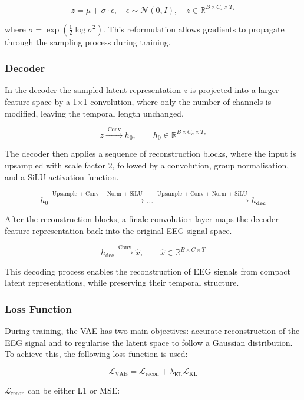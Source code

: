\[
z = \mu + \sigma \cdot \epsilon, \quad \epsilon \sim \mathcal{N}(0, I), \quad z \in \mathbb{R}^{B \times C_z \times T_z}
\]

where $\sigma = \exp\left(\frac{1}{2} \log \sigma^2 \right)$. This reformulation allows gradients to propagate through the sampling process during training.

\subsubsection{Decoder}

In the decoder the sampled latent representation $z$ is projected into a larger feature space by a 1$\times$1 convolution, where only the number of channels is modified, leaving the temporal length unchanged. 

\[
z  \xrightarrow{\;\text{Conv}\;} h_0, \qquad h_0 \in \mathbb{R}^{B \times C_d \times T_z}
\]

The decoder then applies a sequence of reconstruction blocks, where the input is upsampled with scale factor 2, followed by a convolution, group normalisation, and a SiLU activation function. 

\[
h_0 \xrightarrow{\;\text{Upsample + Conv + Norm + SiLU}\;} \ldots \xrightarrow{\;\text{Upsample + Conv + Norm + SiLU}\;} h_\textbf{dec} 
\]

After the reconstruction blocks, a finale convolution layer maps the decoder feature representation back into the original EEG signal space.

\[
h_{\text{dec}} \xrightarrow{\;\text{Conv}\;} \hat{x}, \qquad \hat{x} \in \mathbb{R}^{B \times C \times T}
\]

This decoding process enables the reconstruction of EEG signals from compact latent representations, while preserving their temporal structure.

\subsubsection{Loss Function}

During training, the VAE has two main objectives: accurate reconstruction of the EEG signal and to regularise the latent space to follow a Gaussian distribution. To achieve this, the following loss function is used: 

\[
\mathcal{L}_{\text{VAE}} = \mathcal{L}_{\text{recon}} + \lambda_{\text{KL}} \mathcal{L}_{\text{KL}}
\]

$\mathcal{L}_{\text{recon}}$ can be either L1 or MSE:

